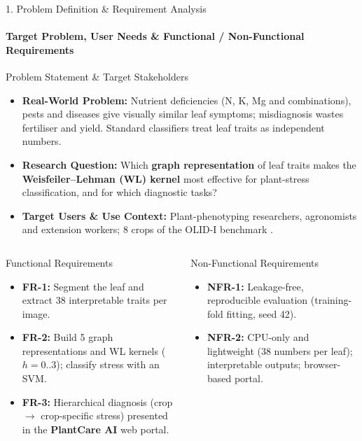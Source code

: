 \documentclass[aspectratio=169, 11pt]{beamer}
\begin{document}
\begin{frame}{1. Problem Definition \& Requirement Analysis}
    \framesubtitle{Target Problem, User Needs \& Functional / Non-Functional Requirements}
    \begin{block}{Problem Statement \& Target Stakeholders}
        \scriptsize
        \begin{itemize}
            \item \textbf{Real-World Problem:} Nutrient deficiencies (N, K, Mg and combinations), pests and diseases give visually similar leaf symptoms; misdiagnosis wastes fertiliser and yield. Standard classifiers treat leaf traits as independent numbers.
            \item \textbf{Research Question:} Which \textbf{graph representation} of leaf traits makes the \textbf{Weisfeiler--Lehman (WL) kernel} most effective for plant-stress classification, and for which diagnostic tasks?
            \item \textbf{Target Users \& Use Context:} Plant-phenotyping researchers, agronomists and extension workers; 8 crops of the OLID-I benchmark \cite{orka2023olid}.
        \end{itemize}
    \end{block}

    \begin{columns}[T]
        \begin{block}{Functional Requirements}
            \scriptsize
            \begin{itemize}
                \item \textbf{FR-1:} Segment the leaf and extract 38 interpretable traits per image.
                \item \textbf{FR-2:} Build 5 graph representations and WL kernels ($h=0..3$); classify stress with an SVM.
                \item \textbf{FR-3:} Hierarchical diagnosis (crop $\rightarrow$ crop-specific stress) presented in the \textbf{PlantCare AI} web portal.
            \end{itemize}
        \end{block}
        \begin{block}{Non-Functional Requirements}
            \scriptsize
            \begin{itemize}
                \item \textbf{NFR-1:} Leakage-free, reproducible evaluation (training-fold fitting, seed 42).
                \item \textbf{NFR-2:} CPU-only and lightweight (38 numbers per leaf); interpretable outputs; browser-based portal.
            \end{itemize}
        \end{block}
    \end{columns}
\end{frame}
\end{document}
